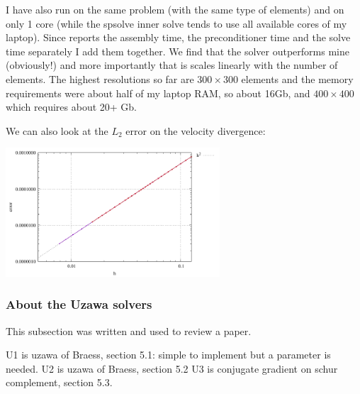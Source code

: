 I have also run \aspect on the same problem (with the same type of elements) and on only 
1 core (while the spsolve inner solve tends to use all available cores of my laptop). 
Since \aspect reports the assembly time, the preconditioner time and the solve
time separately I add them together.
We find that the solver outperforms mine (obviously!) and more importantly that 
is scales linearly with the number of elements. 
The highest resolutions so far are $300\times 300$ elements and the memory requirements 
were about half of my laptop RAM, so about 16Gb, and $400\times 400$ which requires
about 20+ Gb.


We can also look at the $L_2$ error on the velocity divergence:

\begin{center}
\includegraphics[width=8cm]{python_codes/fieldstone_147/RESULTS/error_divv.pdf}
\end{center}

\newpage
\subsubsection*{About the Uzawa solvers}

This subsection was written and used to review a paper.

U1 is uzawa of Braess, section 5.1: simple to implement but a parameter is needed. 
U2 is uzawa of Braess, section 5.2
U3 is conjugate gradient on schur complement, section 5.3.

